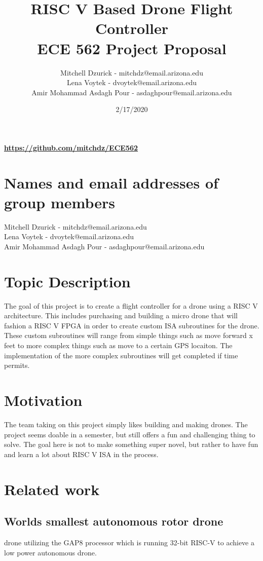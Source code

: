 \documentclass[12pt]{article}
\title {{\bf RISC V Based Drone Flight Controller} \\
\large{ECE 562 Project Proposal}}
\author{
Mitchell Dzurick - mitchdz@email.arizona.edu\\
Lena Voytek - dvoytek@email.arizona.edu\\
Amir Mohammad Asdagh Pour - asdaghpour@email.arizona.edu}
\date{2/17/2020}
\begin{document}
\maketitle
\begin{center}
\textbf{\url{https://github.com/mitchdz/ECE562}}
\end{center}


\tableofcontents 
\clearpage

\section{Names and email addresses of group members}
Mitchell Dzurick - mitchdz@email.arizona.edu\\
Lena Voytek - dvoytek@email.arizona.edu\\
Amir Mohammad Asdagh Pour - asdaghpour@email.arizona.edu

\section{Topic Description}
The goal of this project is to create a flight controller for a drone using a RISC V architecture. This includes purchasing and building a micro drone that will fashion a RISC V FPGA in order to create custom ISA subroutines for the drone. These custom subroutines will range from simple things such as move forward x feet to more complex things such as move to a certain GPS locaiton. The implementation of the more complex subroutines will get completed if time permits.

\section{Motivation}
The team taking on this project simply likes building and making drones. The project seems doable in a semester, but still offers a fun and challenging thing to solve. The goal here is not to make something super novel, but rather to have fun and learn a lot about RISC V ISA in the process.

\section{Related work}
\subsection{Worlds smallest autonomous rotor drone}
drone utilizing the GAP8 processor which is running 32-bit RISC-V to achieve a low power autonomous drone.
\end{document}
